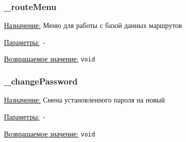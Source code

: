 \subsubsection{\_routeMenu}

\underline{Назначение:} Меню для работы с базой данных маршрутов

\underline{Параметры:} \verb|-|

\underline{Возвращаемое значение:} \verb|void|


\subsubsection{\_changePassword}

\underline{Назначение:} Смена установленного пароля на новый

\underline{Параметры:} \verb|-|

\underline{Возвращаемое значение:} \verb|void|

